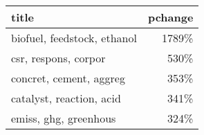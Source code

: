\begin{tabular}{p{1.2cm}r}
\toprule
                       title &  pchange \\
\midrule
 biofuel, feedstock, ethanol &    1789\% \\
        csr, respons, corpor &     530\% \\
     concret, cement, aggreg &     353\% \\
    catalyst, reaction, acid &     341\% \\
       emiss, ghg, greenhous &     324\% \\
\bottomrule
\end{tabular}

